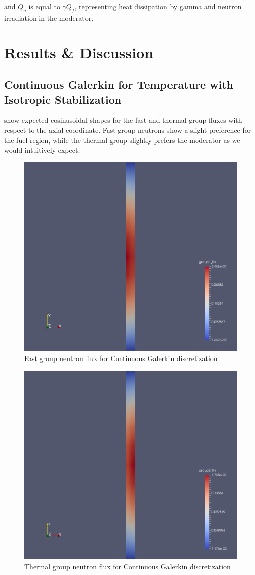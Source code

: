 \documentclass{article}
\let\Oldsection\section
\renewcommand{\section}{\FloatBarrier\Oldsection}
\let\Oldsubsection\subsection
\renewcommand{\subsection}{\FloatBarrier\Oldsubsection}
\begin{document}
and $Q_g$ is equal to $\gamma Q_f$, representing heat dissipation by gamma and
neutron irradiation in the moderator.

\section{Results \& Discussion}

\subsection{Continuous Galerkin for Temperature with Isotropic Stabilization}

 show expected cosinusoidal shapes for the
fast and thermal group fluxes with respect to the axial coordinate. Fast group neutrons
show a slight preference for the fuel region, while the thermal group slightly
prefers the moderator as we would intuitively expect.

\begin{figure}[htpb]
  \centering
  \includegraphics[width=.5\textwidth]{nt_group_1.png}
  \caption{Fast group neutron flux for Continuous Galerkin discretization}
  \label{fig:cg_group1}
\end{figure}

\begin{figure}[htpb]
  \centering
  \includegraphics[width=.5\textwidth]{nt_group_2.png}
  \caption{Thermal group neutron flux for Continuous Galerkin discretization}
  \label{fig:cg_group2}
\end{figure}
\end{document}

